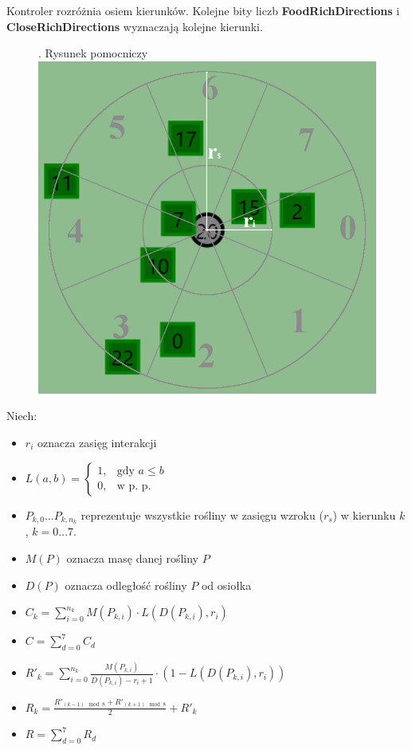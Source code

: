 Kontroler rozróżnia osiem kierunków. Kolejne bity liczb \textbf{FoodRichDirections} i \textbf{CloseRichDirections} wyznaczają kolejne kierunki.

\begin{figure}[H]
    . Rysunek pomocniczy\\
    \includegraphics[scale=0.4]{Chapters/vision}
\end{figure}

Niech:
\begin{itemize}
    \item $r_{i}$ oznacza zasięg interakcji
    \item
     $L(a,b)= 
    \begin{cases}
        1,& \text{gdy } a\leq b\\
        0,              & \text{w p. p.}
    \end{cases}
    $
    \item $P_{k,0}...P_{k,n_{k}}$ reprezentuje wszystkie rośliny w zasięgu wzroku ($r_{s}$) w kierunku $k$, $k=0...7$. 
    \item $M(P)$ oznacza masę danej rośliny $P$
    \item $D(P)$ oznacza odległość rośliny $P$ od osiołka
    \item $C_{k} = \sum_{i=0}^{n_{k}} M(P_{k,i}) \cdot L(D(P_{k,i}),r_{i})  $
    \item $C = \sum_{d=0}^{7} C_{d}$
    \item $R'_{k} = \sum_{i=0}^{n_{k}} \frac{M(P_{k,i})}{D(P_{k,i}) - r_{i} + 1} \cdot (1-L(D(P_{k,i}),r_{i})) $
    \item $R_{k} = \frac{R'_{(k-1) \mod 8} + R'_{(k+1) \mod 8}}{2} + R'_{k}$
    \item $R = \sum_{d=0}^{7} R_{d}$
\end{itemize}

